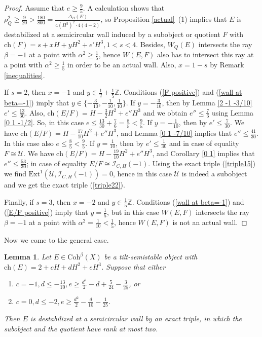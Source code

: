 \documentclass{amsart}
\newtheorem{lemma}[theorem]{Lemma}
\begin{document}
	\begin{proof}Assume that $e\ge\frac 95$. A calculation shows that $\rho_Q^2\ge\frac{9}{20}>\frac{180}{800}=\frac{\overline{\Delta}_H(E)}{4(H^3)^2\cdot 4(4-2)}$, so Proposition \ref{actual}~(1) implies that $E$ is destabilized at a semicircular wall induced by a subobject or quotient $F$ with $\mathrm{ch}(F)=s+xH+yH^2+e'H^3,1<s<4$. Besides, $W_Q(E)$ intersects the ray $\beta=-1$ at a point with $\alpha^2\ge\frac 15$, hence $W(E,F)$ also has to intersect this ray at a point with $\alpha^2\ge\frac 15$ in order to be an actual wall. Also, $x=1-s$ by Remark \ref{inequalities}.
		
		If $s=2$, then $x=-1$ and $y\in\frac 12+\frac 15\mathbb Z$. Conditions (\ref{F positive}) and (\ref{wall at beta=-1}) imply that $y\in\{-\frac{3}{10},-\frac{1}{10},\frac{1}{10}\}$. If $y=-\frac{3}{10}$, then by Lemma \ref{2 -1 -3/10} $e'\le\frac{13}{30}$. Also, $\mathrm{ch}(E/F)=H-\frac 32H^2+e''H^3$ and we obtain $e''\le\frac 76$ using Lemma \ref{0 1 -1/2}. So, in this case $e\le\frac{13}{30}+\frac 76=\frac 85<\frac 95$. If $y=-\frac{1}{10}$, then by \cite[Lemma 3.8]{Vass} $e'\le\frac{7}{30}$. We have $\mathrm{ch}(E/F)=H-\frac{17}{10}H^2+e''H^3$, and Lemma \ref{0 1 -7/10} implies that $e''\le\frac{41}{30}$. In this case also $e\le\frac 85<\frac 95$. If $y=\frac{1}{10}$, then by \cite[Lemma 3.6]{Vass} $e'\le\frac{1}{30}$ and in case of equality $F\cong\mathcal U$. We have $\mathrm{ch}(E/F)=H-\frac{19}{10}H^2+e''H^3$, and Corollary \ref{0 1} implies that $e''\le\frac{53}{30}$; in case of equality $E/F\cong\mathcal I_{C,H}(-1)$. Using the exact triple (\ref{triple15}) we find $\mathrm{Ext}^1(\mathcal U,\mathcal I_{C,H}(-1))=0$, hence in this case $\mathcal U$ is indeed a subobject and we get the exact triple (\ref{triple22}).
		
		Finally, if $s=3$, then $x=-2$ and $y\in\frac 15\mathbb Z$. Conditions (\ref{wall at beta=-1}) and (\ref{E/F positive}) imply that $y=\frac 15$, but in this case $W(E,F)$ intersects the ray $\beta=-1$ at a point with $\alpha^2=\frac{1}{10}<\frac 15$, hence $W(E,F)$ is not an actual wall.
	\end{proof}
	
	Now we come to the general case.
	
	\begin{lemma}\label{0 1 2} Let $E\in\mathrm{Coh}^\beta(X)$ be a tilt-semistable object with $\mathrm{ch}(E)=2+cH+dH^2+eH^3$. Suppose that either
		\begin{enumerate}
			\item $c=-1,d\le-\frac{13}{10},e\ge\frac{d^2}{2}-d+\frac{5}{24}-\frac{3}{25}$, or
			\item $c=0,d\le -2,e\ge\frac{d^2}{2}-\frac{d}{10}-\frac{1}{25}$.
		\end{enumerate}
		Then $E$ is destabilized at a semicircular wall by an exact triple, in which the subobject and the quotient have rank at most two.
	\end{lemma}
	
\end{document}
